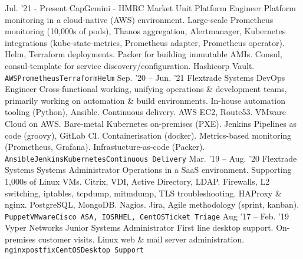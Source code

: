 \documentclass[10pt]{developercv} %
\begin{document}
\begin{entrylist}
  \entry
    {Jul. '21 - Present}
    {CapGemini - HMRC Market Unit}
    {Platform Engineer}
    {Platform monitoring in a cloud-native (AWS) environment. Large-scale Prometheus monitoring (10,000s of pods), Thanos aggregation, Alertmanager, Kubernetes \linebreak integrations (kube-state-metrics, Prometheus adapter, Prometheus \linebreak operator). Helm, Terraform deployments. Packer for building immutable AMIs.  \linebreak Consul, consul-template for service discovery/configuration. Hashicorp Vault.\\ \texttt{AWS}\slashsep\texttt{Prometheus}\slashsep\texttt{Terraform}\slashsep\texttt{Helm}}
	\entry
		{Sep. '20 -- Jun. '21}
		{Flextrade Systems}
		{DevOps Engineer}
    {Cross-functional working, unifying operations \& development teams, primarily working \linebreak on automation \& build environments. In-house automation tooling (Python), \linebreak Ansible. Continuous delivery. AWS EC2, Route53. VMware Cloud on AWS. Bare-metal \linebreak Kubernetes on-premises (PXE). Jenkins Pipelines as code (groovy), GitLab CI. \linebreak Containerisation (docker). Metrics-based monitoring (Prometheus, Grafana). Infrastucture-as-code (Packer).\\ \texttt{Ansible}\slashsep\texttt{Jenkins}\slashsep\texttt{Kubernetes}\slashsep\texttt{Continuous Delivery}}
	\entry
		{Mar. '19 -- Aug. '20}
		{Flextrade Systems}
		{Systems Administrator}
    {Operations in a SaaS environment. Supporting 1,000s of Linux VMs. Citrix, VDI, \linebreak Active Directory, LDAP. Firewalls, L2 switching, iptables, tcpdump, mitmdump, \linebreak TLS troubleshooting. HAProxy \& nginx. PostgreSQL, MongoDB. Nagios. Jira, Agile methodology (sprint, kanban).\\ \texttt{Puppet}\slashsep\texttt{VMware}\slashsep\texttt{Cisco ASA, IOS}\slashsep\texttt{RHEL, CentOS}\slashsep\texttt{Ticket Triage}}
	\entry
		{Aug '17 -- Feb. '19}
		{Vyper Networks}
		{Junior Systems Administrator}
    {First line desktop support. On-premises customer visits. Linux web \& mail server \linebreak administration.\\ \texttt{nginx}\slashsep\texttt{postfix}\slashsep\texttt{CentOS}\slashsep\texttt{Desktop Support}}
\end{entrylist}
\end{document}
